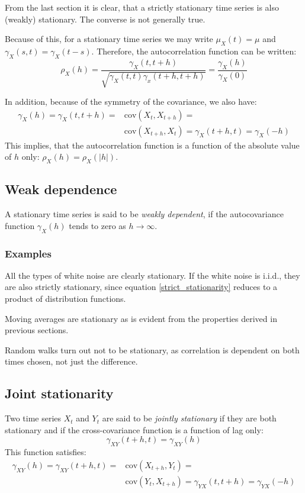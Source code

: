 \documentclass[12pt, a4paper]{article}
\numberwithin{equation}{section}
\begin{document}
From the last section it is clear, that a strictly stationary time series is also (weakly) stationary. The converse is not generally true.

Because of this, for a stationary time series we may write $\mu_X(t)=\mu$ and $\gamma_X(s,t)=\gamma_X(t-s)$. Therefore, the autocorrelation function can be written:
\begin{equation}
\rho_X(h)=\frac{\gamma_X(t,t+h)}{\sqrt{\gamma_X(t,t)\gamma_x(t+h,t+h)}}=\frac{\gamma_X(h)}{\gamma_X(0)}
\end{equation}

In addition, because of the symmetry of the covariance, we also have:
\begin{align}
\gamma_X(h)=\gamma_X(t,t+h)=&\textrm{cov}(X_t,X_{t+h})=\\
&\textrm{cov}(X_{t+h},X_t)=\gamma_X(t+h,t)=\gamma_X(-h)
\end{align}
This implies, that the autocorrelation function is a function of the absolute value of $h$ only: $\rho_X(h)=\rho_X(|h|)$.

\subsection{Weak dependence}
A stationary time series is said to be \textit{weakly dependent}, if the autocovariance function $\gamma_X(h)$ tends to zero as $h\rightarrow\infty$.

\subsubsection{Examples}
All the types of white noise are clearly stationary. If the white noise is i.i.d., they are also strictly stationary, since equation \ref{strict_stationarity} reduces to a product of distribution functions.

Moving averages are stationary as is evident from the properties derived in previous sections.

Random walks turn out not to be stationary, as correlation is dependent on both times chosen, not just the difference.

\subsection{Joint stationarity}
Two time series $X_t$ and $Y_t$ are said to be \textit{jointly stationary} if they are both stationary and if the cross-covariance function is a function of lag only:
\begin{equation}
\gamma_{XY}(t+h,t)=\gamma_{XY}(h)
\end{equation}
This function satisfies:
\begin{align}
\gamma_{XY}(h)=\gamma_{XY}(t+h,t)=&\textrm{cov}(X_{t+h},Y_t)=\\
&\textrm{cov}(Y_t,X_{t+h})=\gamma_{YX}(t,t+h)=\gamma_{YX}(-h)
\end{align}
\end{document}
